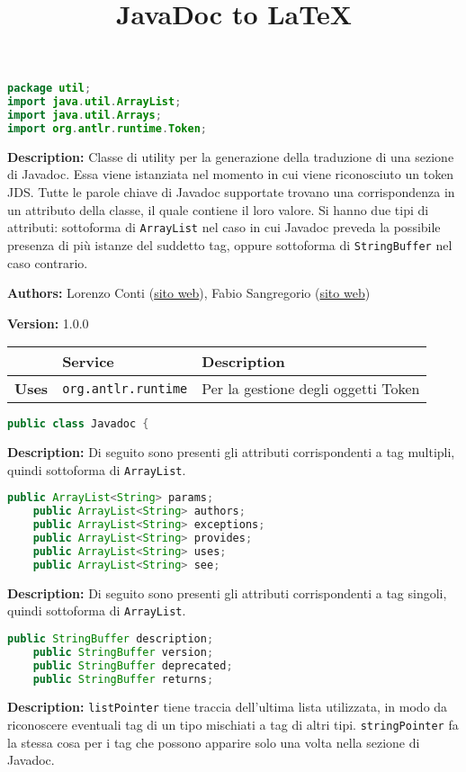 \documentclass{article}
\title{JavaDoc to LaTeX}
\begin{document}
\begin{lstlisting}[language=Java]
package util;
import java.util.ArrayList;
import java.util.Arrays;
import org.antlr.runtime.Token;
\end{lstlisting}
\textbf{Description:}  Classe di utility per la generazione della traduzione di una sezione di Javadoc.  Essa viene istanziata nel momento in cui viene riconosciuto un token JDS. Tutte le parole chiave di Javadoc supportate trovano una corrispondenza in un attributo della classe, il quale contiene il loro valore. Si hanno due tipi di attributi: sottoforma di \texttt{ArrayList} nel caso in cui Javadoc preveda la possibile presenza di più istanze del suddetto tag, oppure sottoforma di \texttt{StringBuffer} nel caso contrario.  

\textbf{Authors:} Lorenzo Conti        (\href{https://www.lorenzoconti.dev}{sito web}), Fabio Sangregorio    (\href{https://fabio.sangregorio.dev}{sito web})

\textbf{Version:} 1.0.0

\begin{table}[!h]\centering
\begin{tabular}{|l|p{}|p{}|}
\hline & \textbf{Service} & \textbf{Description} \\ \hline
\multirow{1}{*}{\textbf{Uses}}
& \texttt{org.antlr.runtime} & Per la gestione degli oggetti Token \\
\hline
\end{tabular}\end{table}
\begin{lstlisting}[language=Java]
public class Javadoc {
\end{lstlisting}
\textbf{Description:}  Di seguito sono presenti gli attributi corrispondenti a tag multipli, quindi sottoforma di \texttt{ArrayList}.

\begin{lstlisting}[language=Java]
    public ArrayList<String> params;
    public ArrayList<String> authors;
    public ArrayList<String> exceptions;
    public ArrayList<String> provides;
    public ArrayList<String> uses;
    public ArrayList<String> see;
\end{lstlisting}
\textbf{Description:}  Di seguito sono presenti gli attributi corrispondenti a tag singoli, quindi sottoforma di \texttt{ArrayList}.

\begin{lstlisting}[language=Java]
    public StringBuffer description;
    public StringBuffer version;
    public StringBuffer deprecated;
    public StringBuffer returns;
\end{lstlisting}
\textbf{Description:}  \texttt{listPointer} tiene traccia dell'ultima lista utilizzata, in modo da riconoscere eventuali tag di un tipo mischiati a tag di altri tipi. \texttt{stringPointer} fa la stessa cosa per i tag che possono apparire solo una volta nella sezione di Javadoc.
\end{document}
